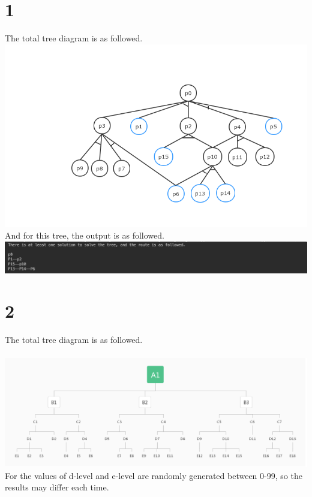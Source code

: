\documentclass{article}
\begin{document}
\section*{1}
The total tree diagram is as followed.\\
\includegraphics[scale=0.45]{result1.jpg}\\

And for this tree, the output is as followed.\\
\includegraphics[scale=0.365]{output1-1.png}\\
\newpage
\section*{2}

The total tree diagram is as followed.\\\\
\includegraphics[scale=0.2]{result2.jpg}\\

For the values of d-level and e-level are randomly generated between 0-99, so the results may differ each time.\\
\end{document}
